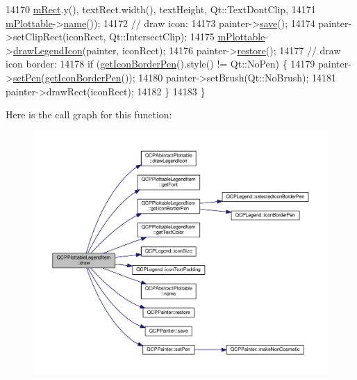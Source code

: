 \begin{DoxyCode}
14170                     \hyperlink{class_q_c_p_layout_element_ad8896f05550389f7b9e92c9e6cdf6e01}{mRect}.y(), textRect.width(), textHeight, Qt::TextDontClip,
14171                     \hyperlink{class_q_c_p_plottable_legend_item_ada647fb4b22971a1a424e15b4f6af0d9}{mPlottable}->\hyperlink{class_q_c_p_abstract_plottable_a1affc1972938e4364a9325e4e4e4dcea}{name}());
14172   \textcolor{comment}{// draw icon:}
14173   painter->\hyperlink{class_q_c_p_painter_a8fd6821ee6fecbfa04444c9062912abd}{save}();
14174   painter->setClipRect(iconRect, Qt::IntersectClip);
14175   \hyperlink{class_q_c_p_plottable_legend_item_ada647fb4b22971a1a424e15b4f6af0d9}{mPlottable}->\hyperlink{class_q_c_p_abstract_plottable_a9a450783fd9ed539e589999fd390cdf7}{drawLegendIcon}(painter, iconRect);
14176   painter->\hyperlink{class_q_c_p_painter_a64908e6298d5bbd83457dc987cc3a022}{restore}();
14177   \textcolor{comment}{// draw icon border:}
14178   \textcolor{keywordflow}{if} (\hyperlink{class_q_c_p_plottable_legend_item_ab36270e6b022a6961fa44136f35c0e4b}{getIconBorderPen}().style() != Qt::NoPen) \{
14179     painter->\hyperlink{class_q_c_p_painter_af9c7a4cd1791403901f8c5b82a150195}{setPen}(\hyperlink{class_q_c_p_plottable_legend_item_ab36270e6b022a6961fa44136f35c0e4b}{getIconBorderPen}());
14180     painter->setBrush(Qt::NoBrush);
14181     painter->drawRect(iconRect);
14182   \}
14183 \}
\end{DoxyCode}


Here is the call graph for this function\+:\nopagebreak
\begin{figure}[H]
\begin{center}
\leavevmode
\includegraphics[width=350pt]{class_q_c_p_plottable_legend_item_a68a781c3de4f9959fdf82075052d43aa_cgraph}
\end{center}
\end{figure}


